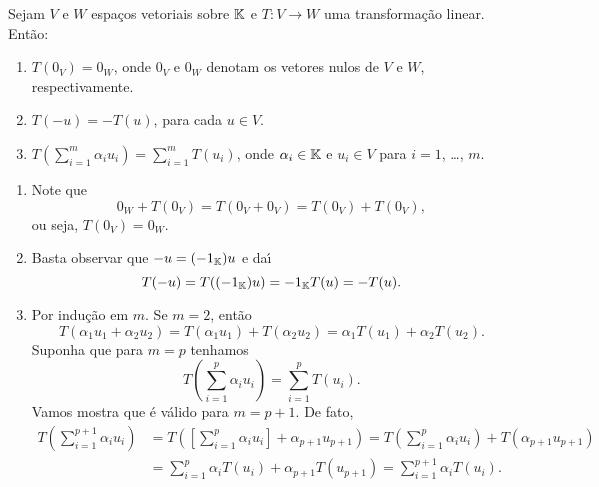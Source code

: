 \begin{lema}
	Sejam $V$ e $W$ espa\c{c}os vetoriais sobre $\mathbb{K}$ e $T : V \to W$ uma transforma\c{c}\~ao linear. Ent\~ao:
	\begin{enumerate}\label{transformacao_linear_propriedades_basicas}
		\item $T(0_V) = 0_W$, onde $0_V$ e $0_W$ denotam os vetores nulos de $V$ e $W$, respectivamente.

		\item $T(-u) = -T(u)$, para cada $u \in V$.

		\item $T(\sum_{i=1}^m\alpha_iu_i) = \sum_{i=1}^mT(u_i)$, onde $\alpha_i \in \mathbb{K}$ e $u_i \in V$ para $i = 1$, \dots, $m$.
	\end{enumerate}
\end{lema}
\begin{prova}
	\begin{enumerate}
		\item Note que
		\[
			0_W + T(0_V) = T(0_V + 0_V) = T(0_V) + T(0_V),
		\]
		ou seja, $T(0_V) = 0_W$.

		\item Basta observar que $-u = (-1_{\mathbb{K}})u$ e da{\'\i}
		\[
			T(-u) = T((-1_{\mathbb{K}})u) = -1_{\mathbb{K}}T(u) = -T(u).
		\]

		\item Por indu\c{c}\~ao em $m$. Se $m = 2$, ent\~ao
		\[
			T(\alpha_1u_1 + \alpha_2u_2) = T(\alpha_1u_1) + T(\alpha_2u_2) = \alpha_1T(u_1) + \alpha_2T(u_2).
		\]
		Suponha que para $m = p$ tenhamos
		\[
			T(\sum_{i=1}^p\alpha_iu_i) = \sum_{i=1}^pT(u_i).
		\]
		Vamos mostra que \'e v\'alido para $m = p + 1$. De fato,
		\begin{align*}
			T(\sum_{i=1}^{p+1}\alpha_iu_i) &= T([\sum_{i=1}^p\alpha_iu_i] + \alpha_{p + 1}u_{p + 1}) = T(\sum_{i=1}^p\alpha_iu_i) + T(\alpha_{p+1}u_{p+1}) \\ &= \sum_{i=1}^p\alpha_iT(u_i) + \alpha_{p+1}T(u_{p+1}) = \sum_{i=1}^{p+1}\alpha_iT(u_i).
		\end{align*}
	\end{enumerate}
\end{prova}

